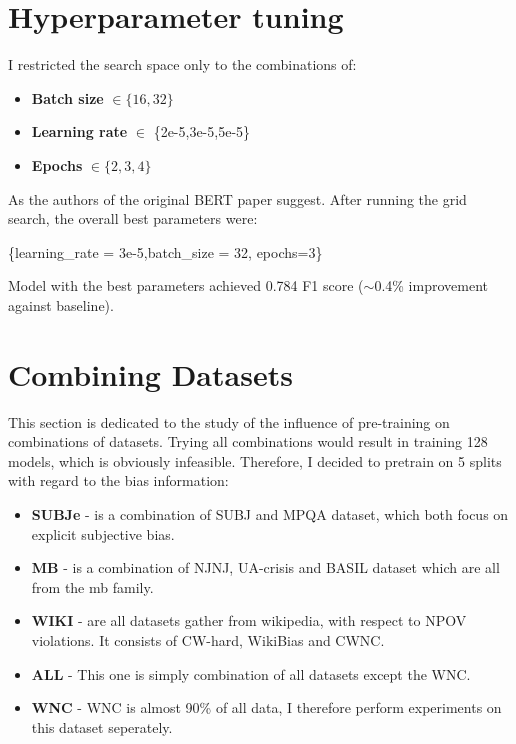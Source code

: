 \newpage

 \section{Hyperparameter tuning}
I restricted the search space only to the combinations of:
 \begin{itemize}
     \item \textbf{Batch size} $\in \{16,32\}$
     \item \textbf{Learning rate} $\in $ \{2e-5,3e-5,5e-5\}
     \item \textbf{Epochs} $\in \{2,3,4\}$
 \end{itemize}
 
 As the authors of the original BERT paper suggest.  After running the grid search, the overall best parameters were:
 \begin{center}
      \{learning\_rate = 3e-5,batch\_size = 32, epochs=3\}
 \end{center}
 
 Model with the best parameters achieved 0.784 F1 score ($\sim$0.4\% improvement against baseline).


 
 






\section{Combining Datasets}
This section is dedicated to the study of the influence of pre-training on combinations of datasets. Trying all combinations would result in training 128 models, which is obviously infeasible. Therefore, I decided to pretrain on 5 splits with regard to the bias information:
\begin{itemize}
    \item \textbf{SUBJe} - is a combination of SUBJ and MPQA dataset, which both focus on explicit subjective bias.
    \item \textbf{MB} - is a combination of NJNJ, UA-crisis and BASIL dataset which are all from the \gls{mb} family.
    \item \textbf{WIKI} - are all datasets gather from wikipedia, with respect to NPOV violations. It consists of CW-hard, WikiBias and CWNC.
    \item \textbf{ALL} - This one is simply combination of all datasets except the WNC.
    \item \textbf{WNC} - WNC is almost 90\% of all data, I therefore perform experiments on this dataset seperately.
\end{itemize}
 
